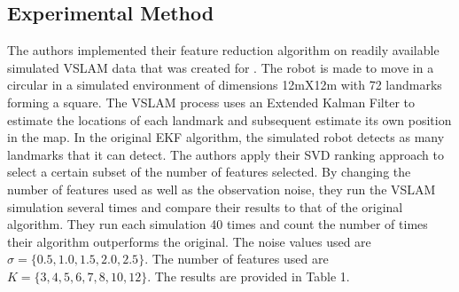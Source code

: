 \documentclass[10pt,twocolumn,letterpaper]{article}
\begin{document}
\subsection{Experimental Method}
The authors implemented their feature reduction algorithm on readily 
available simulated VSLAM data that was created for \cite{31}. 
The robot is made to move in a circular in a simulated environment of dimensions 12mX12m with 72 
landmarks forming a square. The VSLAM process uses an Extended Kalman Filter to estimate the locations 
of each landmark and subsequent estimate its own position in the map. In the original EKF algorithm, the 
simulated robot detects as many landmarks that it can detect. The authors apply their SVD ranking approach
 to select a certain subset of the number of features selected. By changing the number of features used as 
 well as the observation noise, they run the VSLAM simulation several times and compare their results to 
 that of the original algorithm. They run each simulation 40 times and count the number of times their 
 algorithm outperforms the original. The noise values used are $\sigma=\{0.5, 1.0, 1.5, 2.0, 2.5\} $. 
The number of features used are $ K = \{ 3, 4, 5, 6, 7, 8, 10, 12 \}$. 
The results are provided in Table 1. 
\end{document}
